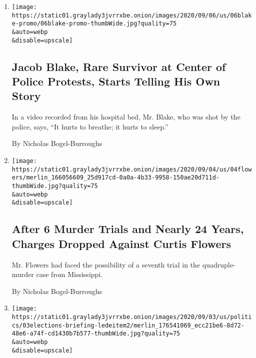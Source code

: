 \begin{enumerate}
\def\labelenumi{\arabic{enumi}.}
\item
  \href{/2020/09/07/us/jacob-blake-video-statement.html}{}

  \texttt{[image: https://static01.graylady3jvrrxbe.onion/images/2020/09/06/us/06blake-promo/06blake-promo-thumbWide.jpg?quality=75\\\&auto=webp\\\&disable=upscale]}

  \hypertarget{jacob-blake-rare-survivor-at-center-of-police-protests-starts-telling-his-own-story}{%
  \subsection{Jacob Blake, Rare Survivor at Center of Police Protests,
  Starts Telling His Own
  Story}\label{jacob-blake-rare-survivor-at-center-of-police-protests-starts-telling-his-own-story}}

  In a video recorded from his hospital bed, Mr. Blake, who was shot by
  the police, says, ``It hurts to breathe; it hurts to sleep.''

  By Nicholas Bogel-Burroughs
\item
  \href{/2020/09/04/us/after-6-murder-trials-and-nearly-24-years-charges-dropped-against-curtis-flowers.html}{}

  \texttt{[image: https://static01.graylady3jvrrxbe.onion/images/2020/09/04/us/04flowers/merlin\_166056609\_25d917cd-0a0a-4b33-9958-150ae20d711d-thumbWide.jpg?quality=75\\\&auto=webp\\\&disable=upscale]}

  \hypertarget{after-6-murder-trials-and-nearly-24-years-charges-dropped-against-curtis-flowers}{%
  \subsection{After 6 Murder Trials and Nearly 24 Years, Charges Dropped
  Against Curtis
  Flowers}\label{after-6-murder-trials-and-nearly-24-years-charges-dropped-against-curtis-flowers}}

  Mr. Flowers had faced the possibility of a seventh trial in the
  quadruple-murder case from Mississippi.

  By Nicholas Bogel-Burroughs
\item
  \href{/2020/09/04/us/elections/biden-says-win-or-lose-im-going-to-go-down-fighting-for-racial-equality.html}{}

  \texttt{[image: https://static01.graylady3jvrrxbe.onion/images/2020/09/03/us/politics/03elections-briefing-ledeitem2/merlin\_176541069\_ecc21be6-8d72-48e6-a74f-cd1430b7b577-thumbWide.jpg?quality=75\\\&auto=webp\\\&disable=upscale]}


\end{enumerate}
